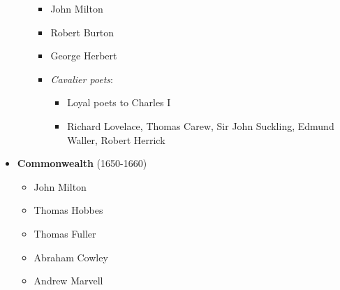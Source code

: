\documentclass[
  12pt,
    progressbar=frametitle]{beamer}
\providecommand{\tightlist}{%
  \setlength{\itemsep}{0pt}\setlength{\parskip}{0pt}}
\begin{document}
\begin{frame}[allowframebreaks]
\begin{itemize}
\begin{itemize}
    \begin{itemize}
    \tightlist
    \item
      John Milton
    \item
      Robert Burton
    \item
      George Herbert
    \item
      \emph{Cavalier poets}:

      \begin{itemize}
      \tightlist
      \item
        Loyal poets to Charles I
      \item
        Richard Lovelace, Thomas Carew, Sir John Suckling, Edmund
        Waller, Robert Herrick
      \end{itemize}
    \end{itemize}
  \end{itemize}
\item
  \textbf{Commonwealth} (1650-1660)

  \begin{itemize}
  \tightlist
  \item
    John Milton
  \item
    Thomas Hobbes
  \item
    Thomas Fuller
  \item
    Abraham Cowley
  \item
    Andrew Marvell
  \end{itemize}
\end{itemize}
\end{frame}
\end{document}
